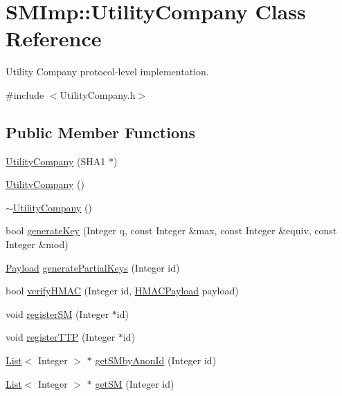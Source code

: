 \hypertarget{classSMImp_1_1UtilityCompany}{}\section{S\+M\+Imp\+:\+:Utility\+Company Class Reference}
\label{classSMImp_1_1UtilityCompany}


Utility Company protocol-\/level implementation.  




{\ttfamily \#include $<$Utility\+Company.\+h$>$}

\subsection*{Public Member Functions}
\begin{DoxyCompactItemize}
\item 
\hyperlink{classSMImp_1_1UtilityCompany_a39c0aca6d615398d97d475b52ee22e89}{Utility\+Company} (S\+H\+A1 $\ast$)
\item 
\hyperlink{classSMImp_1_1UtilityCompany_ab0f04eabfbaf56660c1d199da8170fe0}{Utility\+Company} ()
\item 
\hyperlink{classSMImp_1_1UtilityCompany_a9ef6bb1e7d8032eb305cb227cd68251d}{$\sim$\+Utility\+Company} ()
\item 
bool \hyperlink{classSMImp_1_1UtilityCompany_adeb454bff89a79e454d433bc1ccd448e}{generate\+Key} (Integer q, const Integer \&max, const Integer \&equiv, const Integer \&mod)
\item 
\hyperlink{structSMImp_1_1Payload}{Payload} \hyperlink{classSMImp_1_1UtilityCompany_accfd3e076199f63e5c52ac909976b46a}{generate\+Partial\+Keys} (Integer id)
\item 
bool \hyperlink{classSMImp_1_1UtilityCompany_a5acda2036141ad86d910132004e73b5a}{verify\+H\+M\+AC} (Integer id, \hyperlink{structSMImp_1_1HMACPayload}{H\+M\+A\+C\+Payload} payload)
\item 
void \hyperlink{classSMImp_1_1UtilityCompany_a08a727386b9f32478395975b062d221f}{register\+SM} (Integer $\ast$id)
\item 
void \hyperlink{classSMImp_1_1UtilityCompany_af4559cc4400f5448719aceb32cc53656}{register\+T\+TP} (Integer $\ast$id)
\item 
\hyperlink{classList}{List}$<$ Integer $>$ $\ast$ \hyperlink{classSMImp_1_1UtilityCompany_a76d86a7b253eeb6652dc537d756cbdaf}{get\+S\+Mby\+Anon\+Id} (Integer id)
\item 
\hyperlink{classList}{List}$<$ Integer $>$ $\ast$ \hyperlink{classSMImp_1_1UtilityCompany_a24c3df26cca4ca6ea6855464f2db5249}{get\+SM} (Integer id)

\end{DoxyCompactItemize}
